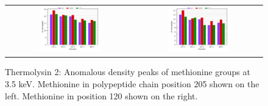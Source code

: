 \begin{figure}
    \centering
    \begin{tabular}{cc}
        \includegraphics[width = 0.5\textwidth]{plots/exp1/tlys_2_P6122/peaks/3p5_met250.pdf} & \includegraphics[width = 0.5\textwidth]{plots/exp1/tlys_2_P6122/peaks/3p5_met120.pdf}
    \end{tabular}
    \caption{Thermolysin 2: Anomalous density peaks of methionine groups at 3.5 \unit{keV}. Methionine in polypeptide chain position 205 shown on the left. Methionine in position 120 shown on the right.}
    \label{fig:tlys2_met_peaks_3p5}
\end{figure}

